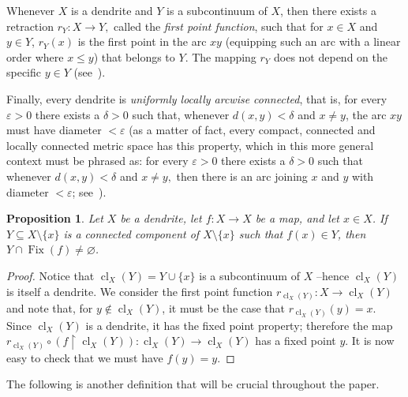 \documentclass[12pt]{amsart}
\newtheorem{proposition}[theorem]{Proposition}
\theoremstyle{definition}
\numberwithin{equation}{section}
\DeclareMathOperator{\fix}{Fix}
\DeclareMathOperator{\cl}{cl}
\begin{document}
Whenever $X$ is a dendrite and $Y$ is a subcontinuum of $X$, then there exists a retraction 
$r_Y \colon X\longrightarrow Y,$ called the {\em first point function}, such that for $x\in X$ and $y\in Y$, $r_Y(x)$ is the first point in the arc $xy$ (equipping such an arc with a linear order where $x\leq y$) that belongs to $Y.$ The mapping $r_Y$ does not depend on the specific $y\in Y$ (see~\cite[Lemmas~10.24, 10.25 and Terminology 10.26]{nadler}).

Finally, every dendrite is {\em uniformly locally arcwise connected}, that is, for every $\varepsilon>0$ there exists a $\delta>0$ such that, whenever $d(x,y)<\delta$ and $x \ne y$, the arc $xy$ must have diameter $<\varepsilon$ (as a matter of fact, every compact, connected and locally connected metric space has this property, which in this more general context must be phrased as: for every $\varepsilon>0$ there exists a $\delta>0$ such that whenever $d(x,y)<\delta$ and
$x \ne y,$ then there is an arc joining $x$ and $y$ with diameter $<\varepsilon$; see~\cite[Theorem~31.4]{willard}).

\begin{proposition}\label{fixpoint}
Let $X$ be a dendrite, let $f \colon X\longrightarrow X$ be a map, and let $x\in X$. If $Y\subseteq X \setminus \{x\}$ is a connected component of $X\setminus \{x\}$ such that $f(x)\in Y$, then 
$Y\cap\fix(f)\neq\varnothing$.
\end{proposition}
\begin{proof}
Notice that $\cl_X(Y)=Y\cup\{x\}$ is a subcontinuum of $X$ --hence $\cl_X(Y)$ is itself a dendrite. We consider the first point function $r_{\cl_X(Y)}:X\longrightarrow \cl_X(Y)$ and note that, for $y\notin \cl_X(Y)$, it must be the case that $r_{\cl_X(Y)}(y)=x$. Since $\cl_X(Y)$ is a dendrite, it has the fixed point property; therefore the map $r_{\cl_X(Y)}\circ (f\upharpoonright \cl_X(Y)) \colon \cl_X(Y)\longrightarrow \cl_X(Y)$ has a fixed point $y$. 
It is now easy to check that we must have $f(y)=y$.
\end{proof}

The following is another definition that will be crucial throughout the paper.
\end{document}
